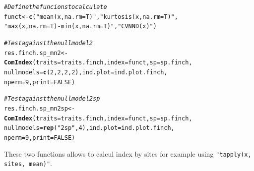 \documentclass[12pt]{article}\usepackage[]{graphicx}\usepackage[]{color}
\makeatletter
\newcommand{\hlnum}[1]{\textcolor[rgb]{0.686,0.059,0.569}{#1}}%
\newcommand{\hlstr}[1]{\textcolor[rgb]{0.192,0.494,0.8}{#1}}%
\newcommand{\hlcom}[1]{\textcolor[rgb]{0.678,0.584,0.686}{\textit{#1}}}%
\newcommand{\hlstd}[1]{\textcolor[rgb]{0.345,0.345,0.345}{#1}}%
\newcommand{\hlkwb}[1]{\textcolor[rgb]{0.69,0.353,0.396}{#1}}%
\newcommand{\hlkwc}[1]{\textcolor[rgb]{0.333,0.667,0.333}{#1}}%
\newcommand{\hlkwd}[1]{\textcolor[rgb]{0.737,0.353,0.396}{\textbf{#1}}}%
\newenvironment{kframe}{%
 \def\at@end@of@kframe{}%
 \ifinner\ifhmode%
  \def\at@end@of@kframe{\end{minipage}}%
  \begin{minipage}{\columnwidth}%
 \fi\fi%
 \def\FrameCommand##1{\hskip\@totalleftmargin \hskip-\fboxsep
 \colorbox{shadecolor}{##1}\hskip-\fboxsep
     \hskip-\linewidth \hskip-\@totalleftmargin \hskip\columnwidth}%
 \MakeFramed {\advance\hsize-\width
   \@totalleftmargin\z@ \linewidth\hsize
   \@setminipage}}%
 {\par\unskip\endMakeFramed%
 \at@end@of@kframe}
\newenvironment{knitrout}{}{} %
\newcommand{\code}[1]{{{\tt #1}}}
\makeatother
\begin{document}
\begin{knitrout}
\color{fgcolor}\begin{kframe}
\begin{alltt}
\hlcom{#Define the funcions to calculate}
\hlstd{funct}\hlkwb{<-}\hlkwd{c}\hlstd{(}\hlstr{"mean(x, na.rm=T)"}\hlstd{,} \hlstr{"kurtosis(x, na.rm=T)"}\hlstd{,}
         \hlstr{"max(x, na.rm=T) - min(x, na.rm=T)"}\hlstd{,} \hlstr{"CVNND(x)"}  \hlstd{)}

\hlcom{#Test against the null model 2}
\hlstd{res.finch.sp_mn2}\hlkwb{<-}\hlkwd{ComIndex}\hlstd{(}\hlkwc{traits}\hlstd{=traits.finch,} \hlkwc{index}\hlstd{=funct,} \hlkwc{sp}\hlstd{=sp.finch,}
                           \hlkwc{nullmodels}\hlstd{=}\hlkwd{c}\hlstd{(}\hlnum{2}\hlstd{,}\hlnum{2}\hlstd{,}\hlnum{2}\hlstd{,}\hlnum{2}\hlstd{),} \hlkwc{ind.plot}\hlstd{=ind.plot.finch,}
                           \hlkwc{nperm}\hlstd{=}\hlnum{9}\hlstd{,} \hlkwc{print}\hlstd{=}\hlnum{FALSE}\hlstd{)}

\hlcom{#Test against the null model 2sp}
\hlstd{res.finch.sp_mn2sp}\hlkwb{<-}\hlkwd{ComIndex}\hlstd{(}\hlkwc{traits}\hlstd{=traits.finch,} \hlkwc{index}\hlstd{=funct,} \hlkwc{sp}\hlstd{=sp.finch,}
                             \hlkwc{nullmodels}\hlstd{=}\hlkwd{rep}\hlstd{(}\hlstr{"2sp"}\hlstd{,}\hlnum{4}\hlstd{),} \hlkwc{ind.plot}\hlstd{=ind.plot.finch,}
                             \hlkwc{nperm}\hlstd{=}\hlnum{9}\hlstd{,} \hlkwc{print}\hlstd{=}\hlnum{FALSE}\hlstd{)}
\end{alltt}
\end{kframe}
\end{knitrout}

These two functions allows to calcul index by sites for example using \code{"tapply(x, sites, mean)"}.
\end{document}
